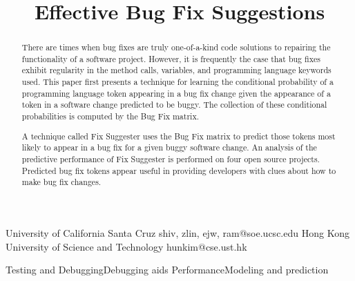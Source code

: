 \documentclass[preprint,10pt]{sigplanconf}
\begin{document}
\title{Effective Bug Fix Suggestions}


		 {University of California Santa Cruz}
		 {{shiv, zlin, ejw, ram}@soe.ucsc.edu}
		 {Hong Kong University of Science and Technology}
		 {hunkim@cse.ust.hk}
		
\maketitle

\begin{abstract}

There are times when bug fixes are truly one-of-a-kind code solutions to repairing the functionality of a software project. However, it is frequently the case that bug fixes exhibit regularity in the method calls, variables, and programming language keywords used. This paper first presents a technique for learning the conditional probability of a programming language token appearing in a bug fix change given the appearance of a token in a software change predicted to be buggy. The collection of these conditional probabilities is computed by the Bug Fix matrix.

A technique called Fix Suggester uses the Bug Fix matrix to predict those tokens most likely to appear in a bug fix for a given buggy software change. An analysis of the predictive performance of Fix Suggester is performed on four open source projects. Predicted bug fix tokens appear useful in providing developers with clues about how to make bug fix changes.

\end{abstract}
 {Testing and Debugging}{Debugging aids}
 {Performance}{Modeling and prediction}
\end{document}
